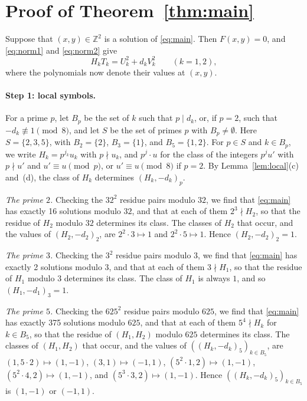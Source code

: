 \documentclass[11pt]{article}
\newcommand{\Z}{\mathbb{Z}}
\begin{document}
\section{Proof of Theorem~\ref{thm:main}}

Suppose that $(x,y)\in\Z^2$ is a solution of \eqref{eq:main}. Then $F(x,y)=0$, and \eqref{eq:norm1} and \eqref{eq:norm2} give
\begin{equation}\label{eq:HT}
H_kT_k=U_k^2+d_kV_k^2\qquad(k=1,2),
\end{equation}
where the polynomials now denote their values at $(x,y)$.

\paragraph{Step 1: local symbols.} For a prime $p$, let $B_p$ be the set of $k$ such that $p\mid d_k$, or, if $p=2$, such that $-d_k\not\equiv1\pmod8$, and let $S$ be the set of primes $p$ with $B_p\neq\emptyset$. Here $S=\{2,3,5\}$, with $B_{2}=\{2\}$, $B_{3}=\{1\}$, and $B_{5}=\{1,2\}$. For $p\in S$ and $k\in B_p$, we write $H_k=p^{j_k}u_k$ with $p\nmid u_k$, and $p^j\cdot u$ for the class of the integers $p^ju'$ with $p\nmid u'$ and $u'\equiv u\pmod p$, or $u'\equiv u\pmod 8$ if $p=2$. By Lemma~\ref{lem:local}(c) and~(d), the class of $H_k$ determines $(H_k,-d_k)_p$.

\emph{The prime $2$.} Checking the $32^2$ residue pairs modulo $32$, we find that \eqref{eq:main} has exactly 16 solutions modulo $32$, and that at each of them $2^{3}\nmid H_{2}$, so that the residue of $H_{2}$ modulo $32$ determines its class. The classes of $H_{2}$ that occur, and the values of $(H_{2},-d_{2})_{2}$, are $2^{2}\cdot3\mapsto1$ and $2^{2}\cdot5\mapsto1$. Hence $(H_{2},-d_{2})_{2}=1$.

\emph{The prime $3$.} Checking the $3^2$ residue pairs modulo $3$, we find that \eqref{eq:main} has exactly 2 solutions modulo $3$, and that at each of them $3\nmid H_{1}$, so that the residue of $H_{1}$ modulo $3$ determines its class. The class of $H_{1}$ is always $1$, and so $(H_{1},-d_{1})_{3}=1$.

\emph{The prime $5$.} Checking the $625^2$ residue pairs modulo $625$, we find that \eqref{eq:main} has exactly 375 solutions modulo $625$, and that at each of them $5^{4}\nmid H_k$ for $k\in B_{5}$, so that the residue of $(H_{1},H_{2})$ modulo $625$ determines its class. The classes of $(H_{1},H_{2})$ that occur, and the values of $((H_k,-d_k)_{5})_{k\in B_{5}}$, are $(1,5\cdot2)\mapsto(1,-1)$, $(3,1)\mapsto(-1,1)$, $(5^{2}\cdot1,2)\mapsto(1,-1)$, $(5^{2}\cdot4,2)\mapsto(1,-1)$, and $(5^{3}\cdot3,2)\mapsto(1,-1)$. Hence $((H_k,-d_k)_{5})_{k\in B_{5}}$ is $(1,-1)$ or $(-1,1)$.
\end{document}
